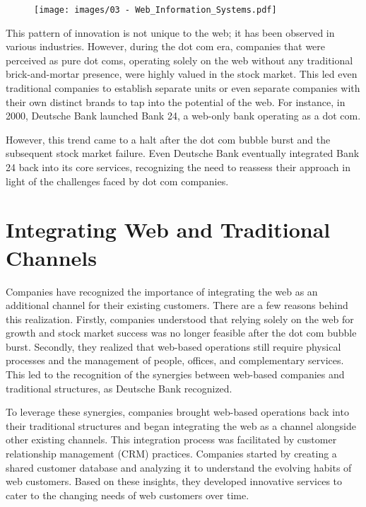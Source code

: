 \begin{figure}[!h]
  \centering
  \texttt{[image: images/03 - Web\_Information\_Systems.pdf]}
\end{figure}

This pattern of innovation is not unique to the web; it has been
observed in various industries. However, during the dot com era,
companies that were perceived as pure dot coms, operating solely on the
web without any traditional brick-and-mortar presence, were highly
valued in the stock market. This led even traditional companies to
establish separate units or even separate companies with their own
distinct brands to tap into the potential of the web. For instance, in
2000, Deutsche Bank launched Bank 24, a web-only bank operating as a dot
com.

However, this trend came to a halt after the dot com bubble burst and
the subsequent stock market failure. Even Deutsche Bank eventually
integrated Bank 24 back into its core services, recognizing the need to
reassess their approach in light of the challenges faced by dot com
companies.

\section{Integrating Web and Traditional
  Channels}\label{integrating-web-and-traditional-channels}

Companies have recognized the importance of integrating the web as an
additional channel for their existing customers. There are a few reasons
behind this realization. Firstly, companies understood that relying
solely on the web for growth and stock market success was no longer
feasible after the dot com bubble burst. Secondly, they realized that
web-based operations still require physical processes and the management
of people, offices, and complementary services. This led to the
recognition of the synergies between web-based companies and traditional
structures, as Deutsche Bank recognized.

To leverage these synergies, companies brought web-based operations back
into their traditional structures and began integrating the web as a
channel alongside other existing channels. This integration process was
facilitated by customer relationship management (CRM) practices.
Companies started by creating a shared customer database and analyzing
it to understand the evolving habits of web customers. Based on these
insights, they developed innovative services to cater to the changing
needs of web customers over time.

